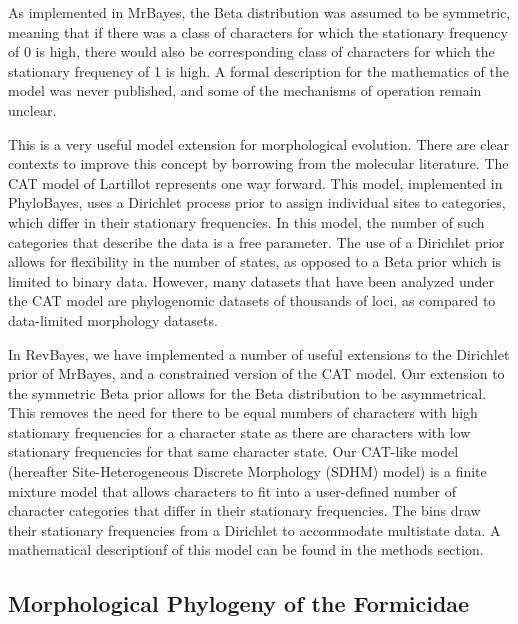\documentclass[]{article}
\begin{document}
As implemented in MrBayes, the Beta distribution was assumed to be symmetric, meaning that if there was a class of characters for which the stationary frequency of 0 is high, there would also be corresponding class of characters for which the stationary frequency of 1 is high.
A formal description for the mathematics of the model was never published, and some of the mechanisms of operation remain unclear. 
\par
This is a very useful model extension for morphological evolution.
There are clear contexts to improve this concept by borrowing from the molecular literature.
The CAT model of Lartillot represents one way forward. 
This model, implemented in PhyloBayes, uses a Dirichlet process prior to assign individual sites to categories, which differ in their stationary frequencies. 
In this model, the number of such categories that describe the data is a free parameter. 
The use of a Dirichlet prior allows for flexibility in the number of states, as opposed to a Beta prior which is limited to binary data.
However, many datasets that have been analyzed under the CAT model are phylogenomic datasets of thousands of loci, as compared to data-limited morphology datasets.\par
In RevBayes, we have implemented a number of useful extensions to the Dirichlet prior of MrBayes, and a constrained version of the CAT model. 
Our extension to the symmetric Beta prior allows for the Beta distribution to be asymmetrical.
This removes the need for there to be equal numbers of characters with high stationary frequencies for a character state as there are characters with low stationary frequencies for that same character state.
Our CAT-like model (hereafter Site-Heterogeneous Discrete Morphology (SDHM) model) is a finite mixture model that allows characters to fit into a user-defined number of character categories that differ in their stationary frequencies. 
The bins draw their stationary frequencies from a Dirichlet to accommodate multistate data. 
A mathematical descriptionf of this model can be found in the methods section. \par

\subsection{Morphological Phylogeny of the Formicidae}
\end{document}
